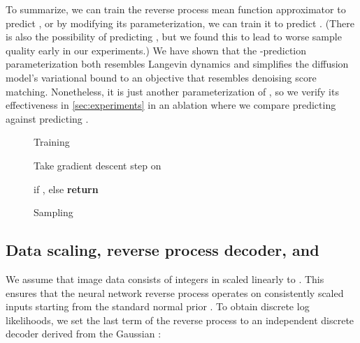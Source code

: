 \documentclass{article}
\begin{document}
To summarize, we can train the reverse process mean function approximator  to predict , or by modifying its parameterization, we can train it to predict . (There is also the possibility of predicting , but we found this to lead to worse sample quality early in our experiments.) We have shown that the  -prediction parameterization both resembles Langevin dynamics and simplifies the diffusion model's variational bound to an objective that resembles denoising score matching.
Nonetheless, it is just another parameterization of , so we verify its effectiveness in \cref{sec:experiments} in an ablation where we compare predicting  against predicting .


\algrenewcommand\algorithmicindent{0.5em}\begin{figure}[t]
\begin{minipage}[t]{0.495\textwidth}
\begin{algorithm}[H]
  \caption{Training} \label{alg:training}
  \small
  \begin{algorithmic}[1]
    \Repeat
      \State 
      \State 
      \State 
      \State Take gradient descent step on
      \Statex 
  \end{algorithmic}
\end{algorithm}
\end{minipage}
\hfill
\begin{minipage}[t]{0.495\textwidth}
\begin{algorithm}[H]
  \caption{Sampling} \label{alg:sampling}
  \small
  \begin{algorithmic}[1]
    \vspace{.04in}
    \State 
    \For{}
      \State  if , else 
      \State 
    \EndFor
    \State \textbf{return} 
    \vspace{.04in}
  \end{algorithmic}
\end{algorithm}
\end{minipage}
\vspace{-1em}
\end{figure}

\subsection[Data scaling and reverse process decoder]{Data scaling, reverse process decoder, and }
We assume that image data consists of integers in  scaled linearly to . This ensures that the neural network reverse process operates on consistently scaled inputs starting from the standard normal prior .
To obtain discrete log likelihoods, we set the last term of the reverse process to an independent discrete decoder derived from the Gaussian :
\end{document}
